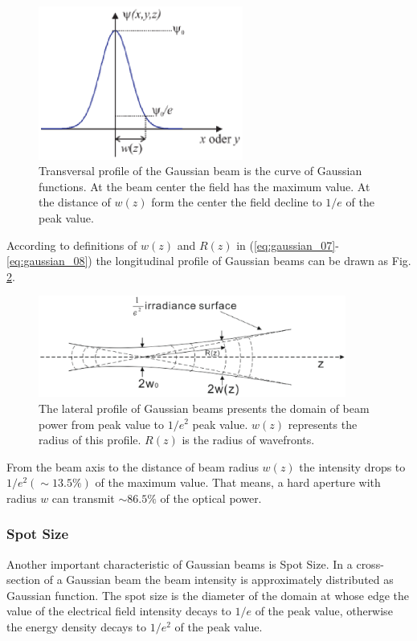 \begin{figure}[!ht]
\centering
\includegraphics[width=0.6\textwidth]{bilder/gussian_verteilung}
\caption{Transversal profile of the Gaussian beam is the curve of Gaussian functions. At the beam center the field has the maximum value. At the distance of $w(z)$ form the center the field decline to $1/e$ of the peak value.}
\label{fig:gaussian_verteilung}
\end{figure}
According to definitions of $w(z)$ and $R(z)$ in (\ref{eq:gaussian_07}-\ref{eq:gaussian_08}) the longitudinal profile of Gaussian beams can be drawn as Fig. \ref{fig:gussian_profile}.
\begin{figure}[!ht]
\centering
\includegraphics[width=0.9\textwidth]{bilder/gussian_profile}
\caption{The lateral profile of Gaussian beams presents the domain of beam power from peak value to $1/e^2$ peak value. $w(z)$ represents the radius of this profile. $R(z)$ is the radius of wavefronts.}
\label{fig:gussian_profile}
\end{figure}
From the beam axis to the distance of beam radius $w(z)$ the intensity drops to $1/e^{2} (\sim13.5\%)$ of the maximum value. That means, a hard aperture with radius $w$ can transmit $\sim86.5\%$ of the optical power.

\subsubsection*{Spot Size}
Another important characteristic of Gaussian beams is Spot Size. In a cross-section of a Gaussian beam the beam intensity is approximately distributed as Gaussian function. The spot size is the diameter of the domain at whose edge the value of the electrical field intensity decays to $1/e$ of the peak value, otherwise the energy density decays to $1/e^2$ of the peak value.
